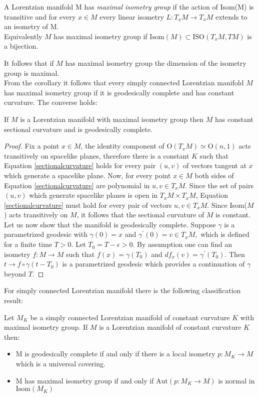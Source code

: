 \begin{definition}
    A Lorentzian manifold M has \textit{maximal isometry group} if the action of Isom(M) is transitive and for every $x\in M$ every linear isometry $L: T_xM \to T_xM$ extends to an isometry of M.\\
    Equivalently $M$ has maximal isometry group if $\text{Isom}(M) \subset \text{ISO}(T_xM, TM)$ is a bijection.
\end{definition}
It follows that if $M$ has maximal isometry group the dimension of the isometry group is maximal.\\
From the corollary it follows that every simply connected Lorentzian manifold $M$ has maximal isometry group if it is geodesically complete and has constant curvature. The converse holds:
\begin{lemma}\label{lem:constant curvature}
    If $M$ is a Lorentzian manifold with maximal isometry group then $M$ has constant sectional curvature and is geodesically complete.
\end{lemma}

\begin{proof}
    Fix a point $x\in M$, the identity component of $\text{O}(T_x M)\simeq \text{O}(n,1)$ acts transitively on spacelike planes, therefore there is a constant $K$ such that Equation \ref{sectionalcurvature} holds for every pair $(u,v)$ of vectors tangent at $x$ which generate a spacelike plane. Now, for every point $x\in M$ both sides of Equation \ref{sectionalcurvature} are polynomial in $u,v \in T_xM$. Since the set of pairs $(u,v)$ which generate spacelike planes is open in $T_{x}M\times T_{x}M$, Equation \ref{sectionalcurvature} must hold for every pair of vectors $u,v \in T_xM$. Since Isom($M$) acts transitively on $M$, it follows that the sectional curvature of $M$ is constant.\\
    Let us now show that the manifold is geodesically complete. Suppose $\gamma$ is a parametrized geodesic with $\gamma(0)=x$ and $\gamma^{\prime} (0)=v\in T_xM,$ which is defined for a finite time $T>0.$ Let $T_0=T-\epsilon>0.$ By assumption one can find an isometry $f:M\to M$ such that $f(x)=\gamma(T_0)$ and $df_x(v)=\gamma^{\prime}(T_0).$ Then $t\to f\circ\gamma(t-T_0)$ is a parametrized geodesic which provides a continuation of $\gamma$ beyond $T$.
\end{proof}


For simply connected Lorentzian manifold there is the following classification result:
\begin{proposition}
    Let $M_K$ be a simply connected Lorentzian manifold of constant curvature $K$ with maximal isometry group. If $M$ is a Lorentzian manifold of constant curvature $K$ then:
    \begin{itemize}
        \item M is geodesically complete if and only if there is a local isometry $p:M_K \to M$ which is a universal covering.
        \item M has maximal isometry group if and only if $\text{Aut}(p:M_K \to M)$ is normal in $\text{Isom}(M_K)$
    \end{itemize}
\end{proposition} 

